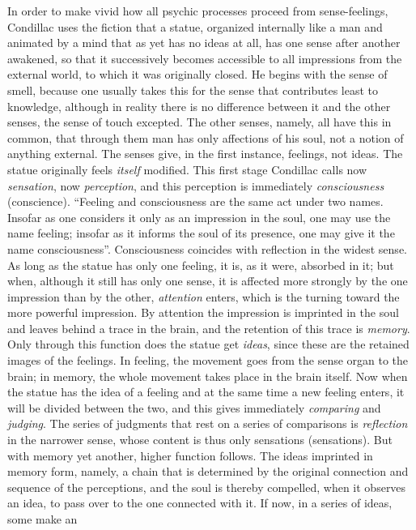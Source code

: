 In order to make vivid how all psychic processes proceed from
sense-feelings, Condillac uses the fiction that a statue, organized
internally like a man and animated by a mind that as yet has no ideas
at all, has one sense after another awakened, so that it successively
becomes accessible to all impressions from the external world, to which
it was originally closed. He begins with the sense of smell, because
one usually takes this for the sense that contributes least to
knowledge, although in reality there is no difference between it and
the other senses, the sense of touch excepted. The other senses, namely,
all have this in common, that through them man has only affections of
his soul, not a notion of anything external. The senses give, in the
first instance, feelings, not ideas. The statue originally feels
\emph{itself} modified. This first stage Condillac calls now
\emph{sensation}, now \emph{perception}, and this perception is
immediately \emph{consciousness} (conscience). ``Feeling and
consciousness are the same act under two names. Insofar as one
considers it only as an impression in the soul, one may use the
name feeling; insofar as it informs the soul of its presence, one may
give it the name consciousness''. Consciousness coincides with
reflection in the widest sense. As long as the statue has only one
feeling, it is, as it were, absorbed in it; but when, although it still
has only one sense, it is affected more strongly by the one impression
than by the other, \emph{attention} enters, which is the turning toward
the more powerful impression. By attention the impression is imprinted
in the soul and leaves behind a trace in the brain, and the retention
of this trace is \emph{memory}. Only through this function does the
statue get \emph{ideas}, since these are the retained images of the
feelings. In feeling, the movement goes from the sense organ to the
brain; in memory, the whole movement takes place in the brain itself.
Now when the statue has the idea of a feeling and at the same time a
new feeling enters, it will be divided between the two, and this gives
immediately \emph{comparing} and \emph{judging}. The series of
judgments that rest on a series of comparisons is \emph{reflection} in
the narrower sense, whose content is thus only sensations (sensations).
But with memory yet another, higher function follows. The ideas
imprinted in memory form, namely, a chain that is determined by the
original connection and sequence of the perceptions, and the soul is
thereby compelled, when it observes an idea, to pass over to the one
connected with it. If now, in a series of ideas, some make an
